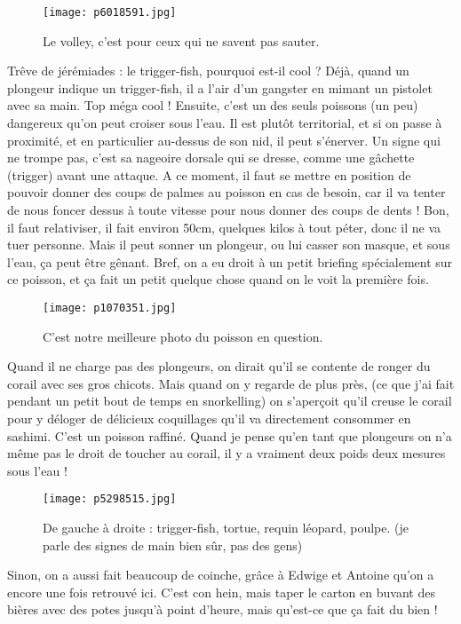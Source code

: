 \documentclass{book}
\begin{document}
\begin{figure}[h]
\centering
\texttt{[image: p6018591.jpg]}
\caption*{Le volley, c'est pour ceux qui ne savent pas sauter.}
\end{figure}

Trêve de jérémiades : le trigger-fish, pourquoi est-il cool ? Déjà, quand un plongeur indique un trigger-fish, il a l'air d'un gangster en mimant un pistolet avec sa main. Top méga cool ! Ensuite, c'est un des seuls poissons (un peu) dangereux qu'on peut croiser sous l'eau. Il est plutôt territorial, et si on passe à proximité, et en particulier au-dessus de son nid, il peut s'énerver. Un signe qui ne trompe pas, c'est sa nageoire dorsale qui se dresse, comme une gâchette (trigger) avant une attaque. A ce moment, il faut se mettre en position de pouvoir donner des coups de palmes au poisson en cas de besoin, car il va tenter de nous foncer dessus à toute vitesse pour nous donner des coups de dents ! Bon, il faut relativiser, il fait environ 50cm, quelques kilos à tout péter, donc il ne va tuer personne. Mais il peut sonner un plongeur, ou lui casser son masque, et sous l'eau, ça peut être gênant. Bref, on a eu droit à un petit briefing spécialement sur ce poisson, et ça fait un petit quelque chose quand on le voit la première fois.


\begin{figure}[h]
\centering
\texttt{[image: p1070351.jpg]}
\caption*{C'est notre meilleure photo du poisson en question.}
\end{figure}

Quand il ne charge pas des plongeurs, on dirait qu'il se contente de ronger du corail avec ses gros chicots. Mais quand on y regarde de plus près, (ce que j'ai fait pendant un petit bout de temps en snorkelling) on s'aperçoit qu'il creuse le corail pour y déloger de délicieux coquillages qu'il va directement consommer en sashimi. C'est un poisson raffiné. Quand je pense qu'en tant que plongeurs on n'a même pas le droit de toucher au corail, il y a vraiment deux poids deux mesures sous l'eau !


\begin{figure}[h]
\centering
\texttt{[image: p5298515.jpg]}
\caption*{De gauche à droite : trigger-fish, tortue, requin léopard, poulpe. (je parle des signes de main bien sûr, pas des gens)}
\end{figure}

Sinon, on a aussi fait beaucoup de coinche, grâce à Edwige et Antoine qu'on a encore une fois retrouvé ici. C'est con hein, mais taper le carton en buvant des bières avec des potes jusqu'à point d'heure, mais qu'est-ce que ça fait du bien !
\end{document}
